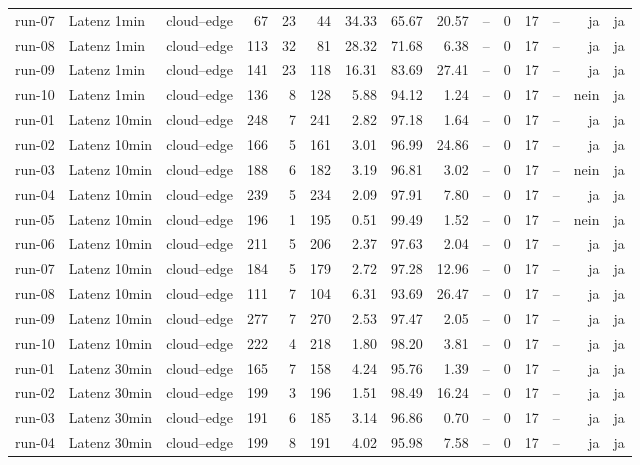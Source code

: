 \begin{table}
\begin{tabular}{l l p{3.2cm} r r r r r r r r r r r r}
run-07 & Latenz 1min & cloud--edge & 67 & 23 & 44 & 34.33 & 65.67 & 20.57 & -- & 0 & 17 & -- & ja & ja \\
run-08 & Latenz 1min & cloud--edge & 113 & 32 & 81 & 28.32 & 71.68 & 6.38 & -- & 0 & 17 & -- & ja & ja \\
run-09 & Latenz 1min & cloud--edge & 141 & 23 & 118 & 16.31 & 83.69 & 27.41 & -- & 0 & 17 & -- & ja & ja \\
run-10 & Latenz 1min & cloud--edge & 136 & 8 & 128 & 5.88 & 94.12 & 1.24 & -- & 0 & 17 & -- & nein & ja \\
run-01 & Latenz 10min & cloud--edge & 248 & 7 & 241 & 2.82 & 97.18 & 1.64 & -- & 0 & 17 & -- & ja & ja \\
run-02 & Latenz 10min & cloud--edge & 166 & 5 & 161 & 3.01 & 96.99 & 24.86 & -- & 0 & 17 & -- & ja & ja \\
run-03 & Latenz 10min & cloud--edge & 188 & 6 & 182 & 3.19 & 96.81 & 3.02 & -- & 0 & 17 & -- & nein & ja \\
run-04 & Latenz 10min & cloud--edge & 239 & 5 & 234 & 2.09 & 97.91 & 7.80 & -- & 0 & 17 & -- & ja & ja \\
run-05 & Latenz 10min & cloud--edge & 196 & 1 & 195 & 0.51 & 99.49 & 1.52 & -- & 0 & 17 & -- & nein & ja \\
run-06 & Latenz 10min & cloud--edge & 211 & 5 & 206 & 2.37 & 97.63 & 2.04 & -- & 0 & 17 & -- & ja & ja \\
run-07 & Latenz 10min & cloud--edge & 184 & 5 & 179 & 2.72 & 97.28 & 12.96 & -- & 0 & 17 & -- & ja & ja \\
run-08 & Latenz 10min & cloud--edge & 111 & 7 & 104 & 6.31 & 93.69 & 26.47 & -- & 0 & 17 & -- & ja & ja \\
run-09 & Latenz 10min & cloud--edge & 277 & 7 & 270 & 2.53 & 97.47 & 2.05 & -- & 0 & 17 & -- & ja & ja \\
run-10 & Latenz 10min & cloud--edge & 222 & 4 & 218 & 1.80 & 98.20 & 3.81 & -- & 0 & 17 & -- & ja & ja \\
run-01 & Latenz 30min & cloud--edge & 165 & 7 & 158 & 4.24 & 95.76 & 1.39 & -- & 0 & 17 & -- & ja & ja \\
run-02 & Latenz 30min & cloud--edge & 199 & 3 & 196 & 1.51 & 98.49 & 16.24 & -- & 0 & 17 & -- & ja & ja \\
run-03 & Latenz 30min & cloud--edge & 191 & 6 & 185 & 3.14 & 96.86 & 0.70 & -- & 0 & 17 & -- & ja & ja \\
run-04 & Latenz 30min & cloud--edge & 199 & 8 & 191 & 4.02 & 95.98 & 7.58 & -- & 0 & 17 & -- & ja & ja \\

\end{tabular}
\end{table}

